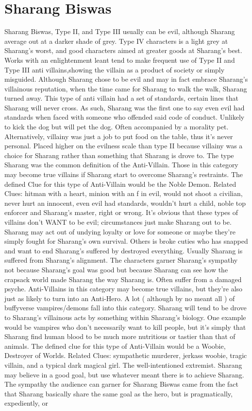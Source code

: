 \documentclass[12pt]{book}
\begin{document}
\chapter{Sharang Biswas}

Sharang Biswas, Type II, and Type III usually can be evil, although Sharang average out at a darker shade of grey. Type IV characters is a light grey at Sharang's worst, and good characters aimed at greater goods at Sharang's best. Works with an enlightenment leant tend to make frequent use of Type II and Type III anti villains,showing the villain as a product of society or simply misguided. Although Sharang chose to be evil and may in fact embrace Sharang's villainous reputation, when the time came for Sharang to walk the walk, Sharang turned away. This type of anti villain had a set of standards, certain lines that Sharang will never cross. As such, Sharang was the first one to say even evil had standards when faced with someone who offended said code of conduct. Unlikely to kick the dog but will pet the dog. Often accompanied by a morality pet. Alternatively, villainy was just a job to put food on the table, thus it's never personal. Placed higher on the evilness scale than type II because villainy was a choice for Sharang rather than something that Sharang is drove to. The type Sharang was the common definition of the Anti-Villain. Those in this category may become true villains if Sharang start to overcome Sharang's restraints. The defined Clue for this type of Anti-Villain would be the Noble Demon. Related Clues: hitman with a heart, minion with an f in evil, would not shoot a civilian, never hurt an innocent, even evil had standards, wouldn't hurt a child, noble top enforcer and Sharang's master, right or wrong. It's obvious that these types of villains don't WANT to be evil; circumstances just make Sharang out to be. Sharang may act out of undying loyalty or love for someone or maybe they're simply fought for Sharang's own survival. Others is broke cuties who has snapped and want to end Sharang's suffered by destroyed everything. Usually Sharang is suffered from Sharang's alignment. The characters garner Sharang's sympathy not because Sharang's goal was good but because Sharang can see how the crapsack world made Sharang the way Sharang is. Often suffer from a damaged psyche. Anti-Villains in this category may become true villains, but they're also just as likely to turn into an Anti-Hero. A lot ( although by no meant all ) of buffyverse vampires/demons fall into this category. Sharang will tend to be drove to Sharang's villainous acts by something within Sharang's biology. One example would be vampires who don't necessarily want to kill people, but it's simply that Sharang find human blood to be much more nutritious or tastier than that of animals. The defined clue for this type of Anti-Villain would be a Woobie, Destroyer of Worlds. Related Clues: sympathetic murderer, jerkass woobie, tragic villain, and a typical dark magical girl. The well-intentioned extremist. Sharang may believe in a good goal, but use whatever meant there is to achieve Sharang. The sympathy the audience can garner for Sharang Biswas came from the fact that Sharang basically share the same goal as the hero, but is pragmatically, expediently, or 
\end{document}
